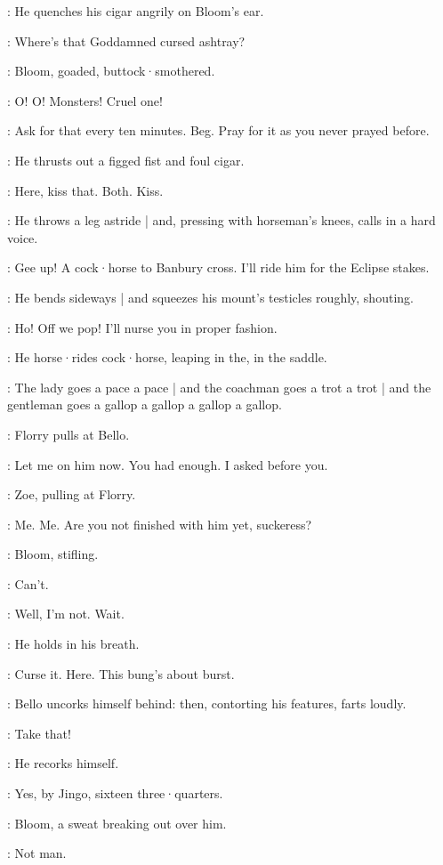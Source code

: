 :
He quenches his cigar angrily on Bloom's ear.

\Bello:
Where's that Goddamned cursed ashtray?

:
Bloom,
goaded,
buttock·smothered.

\Bloom:
O! O!
Monsters!
Cruel one!

\Bello:
Ask for that every ten minutes.
Beg.
Pray for it as you never prayed before.

:
He thrusts out a figged fist and foul cigar.

\Bello:
Here,
kiss that.
Both.
Kiss.

:
He throws a leg astride |
and,
pressing with horseman's knees,
calls in a hard voice.

\Bello:
Gee up!
A cock·horse to Banbury cross.
I'll ride him for the Eclipse stakes.

:
He bends sideways |
and squeezes his mount's testicles roughly,
shouting.

\Bello:
Ho!
Off we pop!
I'll nurse you in proper fashion.

:
He horse·rides cock·horse,
leaping in the,
in the saddle.

\Bello:
The lady goes a pace a pace |
and the coachman goes a trot a trot |
and the gentleman goes a gallop a gallop a gallop a gallop.

:
Florry pulls at Bello.

\Florry:
Let me on him now.
You had enough.
I asked before you.

:
Zoe,
pulling at Florry.

\Zoe:
Me. Me.
Are you not finished with him yet,
suckeress?

:
Bloom,
stifling.

\Bloom:
Can't.

\Bello:
Well,
I'm not.
Wait.

:
He holds in his breath.

\Bello:
Curse it.
Here.
This bung's about burst.

:
Bello uncorks himself behind:
then,
contorting his features,
farts loudly.


\Bello:
Take that!

:
He recorks himself.

\Bello:
Yes,
by Jingo,
sixteen three·quarters.%

:
Bloom,
a sweat breaking out over him.

\Bloom:
Not man.

